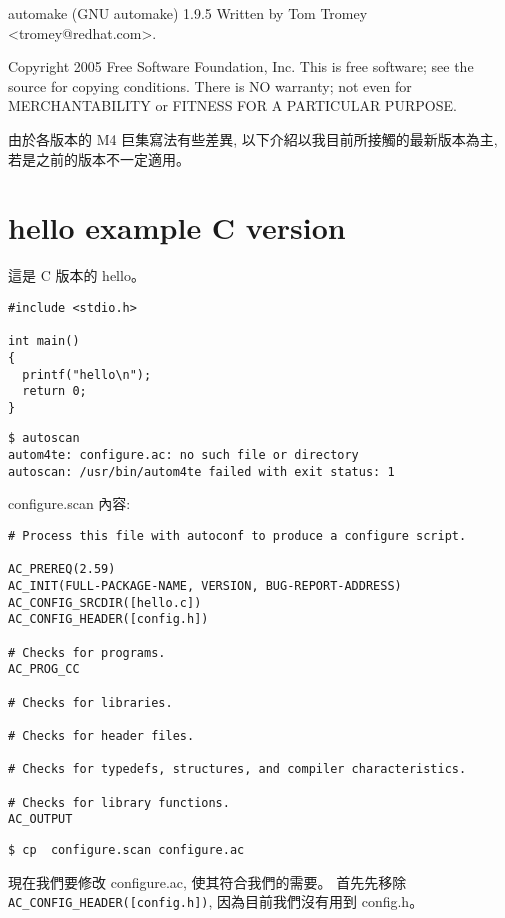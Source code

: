 \documentclass[12pt,a4]{article}
\begin{document}
\begin{CJK}{UTF8}{bsmi}
automake (GNU automake) 1.9.5
Written by Tom Tromey <tromey@redhat.com>.

Copyright 2005 Free Software Foundation, Inc.
This is free software; see the source for copying conditions.  There is NO
warranty; not even for MERCHANTABILITY or FITNESS FOR A PARTICULAR PURPOSE.

由於各版本的 M4 巨集寫法有些差異, 以下介紹以我目前所接觸的最新版本為主,
若是之前的版本不一定適用。

\section{hello example C version}\label{c_hello}

這是 C 版本的 hello。
\begin{lstlisting}[frame=single,frameround=tttt,breaklines=true]
#include <stdio.h>

int main()
{
  printf("hello\n");
  return 0;
}
\end{lstlisting}

\begin{lstlisting}[frame=single,frameround=tttt,breaklines=true]
$ autoscan
autom4te: configure.ac: no such file or directory
autoscan: /usr/bin/autom4te failed with exit status: 1
\end{lstlisting}
configure.scan 內容:

\begin{lstlisting}[frame=single,frameround=tttt,breaklines=true]
# Process this file with autoconf to produce a configure script.

AC_PREREQ(2.59)
AC_INIT(FULL-PACKAGE-NAME, VERSION, BUG-REPORT-ADDRESS)
AC_CONFIG_SRCDIR([hello.c])
AC_CONFIG_HEADER([config.h])

# Checks for programs.
AC_PROG_CC

# Checks for libraries.

# Checks for header files.

# Checks for typedefs, structures, and compiler characteristics.

# Checks for library functions.
AC_OUTPUT
\end{lstlisting}

\begin{verbatim}
$ cp  configure.scan configure.ac
\end{verbatim}

現在我們要修改  configure.ac, 使其符合我們的需要。
首先先移除 \verb+ AC_CONFIG_HEADER([config.h])+,
因為目前我們沒有用到 config.h。


\end{CJK}
\end{document}
